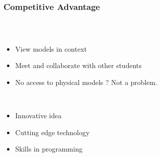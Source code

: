 \begin{frame}
  \frametitle{Competitive Advantage}
  \begin{columns}
    \begin{column}{0.8\textwidth}
      \begin{description}[]
        \item[Integration of Course room and Model Viewing] \hfill \\
        \begin{itemize}
          \item View models in context
          \item Meet and collaborate with other students
          \item No access to physical models ? Not a problem.
        \end{itemize}

        \bigskip
        \item[Our Strengths ] \hfill \\
          \begin{itemize}
            \item Innovative idea
            \item Cutting edge technology
            \item Skills in programming 
        \end{itemize}
      \end{description}
    \end{column}


\end{columns}
\end{frame}

